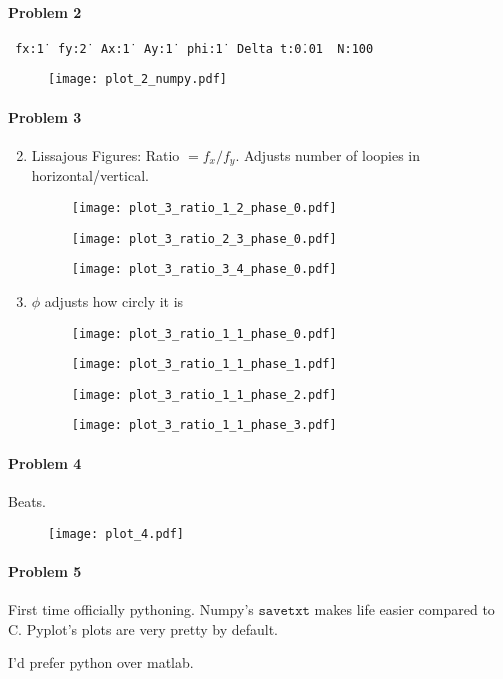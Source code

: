\documentclass[12pt, oneside, letterpaper, fleqn]{article}
\begin{document}
\paragraph{Problem 2}
\texttt{
fx:\. 1\,
fy:\. 2\,
Ax:\. 1\,
Ay:\. 1\,
phi:\. 1\,
Delta t:\. 0.01\,
N:\. 100\,}
\begin{figure}[htbp]
\texttt{[image: plot\_2\_numpy.pdf]}
\end{figure}

\paragraph{Problem 3}
\begin{enumerate}
\setcounter{enumi}{1}
\item Lissajous Figures: Ratio $= f_x/f_y$. Adjusts number of loopies in
horizontal/vertical.
\begin{figure}[htbp]
\texttt{[image: plot\_3\_ratio\_1\_2\_phase\_0.pdf]}
\end{figure}
\begin{figure}[htbp]
\texttt{[image: plot\_3\_ratio\_2\_3\_phase\_0.pdf]}
\end{figure}
\begin{figure}[htbp]
\texttt{[image: plot\_3\_ratio\_3\_4\_phase\_0.pdf]}
\end{figure}

\pagebreak
\item $\phi$ adjusts how circly it is
\begin{figure}[htbp]
\texttt{[image: plot\_3\_ratio\_1\_1\_phase\_0.pdf]}
\end{figure}
\begin{figure}[htbp]
\texttt{[image: plot\_3\_ratio\_1\_1\_phase\_1.pdf]}
\end{figure}
\begin{figure}[htbp]
\texttt{[image: plot\_3\_ratio\_1\_1\_phase\_2.pdf]}
\end{figure}
\begin{figure}[htbp]
\texttt{[image: plot\_3\_ratio\_1\_1\_phase\_3.pdf]}
\end{figure}
\end{enumerate}

\pagebreak
\paragraph{Problem 4}
Beats.
\begin{figure}[htbp]
\texttt{[image: plot\_4.pdf]}
\end{figure}

\paragraph{Problem 5}
First time officially pythoning. Numpy's $\texttt{savetxt}$ makes life
easier compared to C. Pyplot's plots are very pretty by default.

I'd prefer python over matlab.
\end{document}
